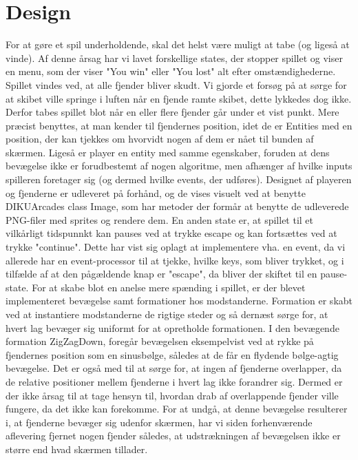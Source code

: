 \section{Design}

For at gøre et spil underholdende, skal det helst være muligt at tabe (og ligeså at vinde). Af denne årsag har vi lavet forskellige states, der stopper spillet og viser en menu, som der viser "You win" eller "You lost" alt efter omstændighederne. Spillet vindes ved, at alle fjender bliver skudt.
Vi gjorde et forsøg på at sørge for at skibet ville springe i luften når en fjende ramte skibet, dette lykkedes dog ikke. Derfor tabes spillet blot når en eller flere fjender går under et vist punkt. Mere præcist benyttes, at man kender til fjendernes position, idet de er Entities med en position, der kan tjekkes om hvorvidt nogen af dem er nået til bunden af skærmen. Ligeså er player en entity med samme egenskaber, foruden at dens bevægelse ikke er forudbestemt af nogen algoritme, men afhænger af hvilke inputs spilleren foretager sig (og dermed hvilke events, der udføres).
Designet af playeren og fjenderne er udleveret på forhånd, og de vises visuelt ved at benytte DIKUArcades class Image, som har metoder der formår at benytte de udleverede PNG-filer med sprites og rendere dem.
En anden state er, at spillet til et vilkårligt tidspunnkt kan pauses ved at trykke escape og kan fortsættes ved at trykke "continue". Dette har vist sig oplagt at implementere vha. en event, da vi allerede har en event-processor til at tjekke, hvilke keys, som bliver trykket, og i tilfælde af at den pågældende knap er "escape", da bliver der skiftet til en pause-state.
For at skabe blot en anelse mere spænding i spillet, er der blevet implementeret bevægelse samt formationer hos modstanderne. Formation er skabt ved at instantiere modstanderne de rigtige steder og så dernæst sørge for, at hvert lag bevæger sig uniformt for at opretholde formationen. I den bevægende formation ZigZagDown, foregår bevægelsen eksempelvist ved at rykke på fjendernes position som en sinusbølge, således at de får en flydende bølge-agtig bevægelse. Det er også med til at sørge for, at ingen af fjenderne overlapper, da de relative positioner mellem fjenderne i hvert lag ikke forandrer sig. Dermed er der ikke årsag til at tage hensyn til, hvordan drab af overlappende fjender ville fungere, da det ikke kan forekomme.
For at undgå, at denne bevægelse resulterer i, at fjenderne bevæger sig udenfor skærmen, har vi siden forhenværende aflevering fjernet nogen fjender således, at udstrækningen af bevægelsen ikke er større end hvad skærmen tillader.
